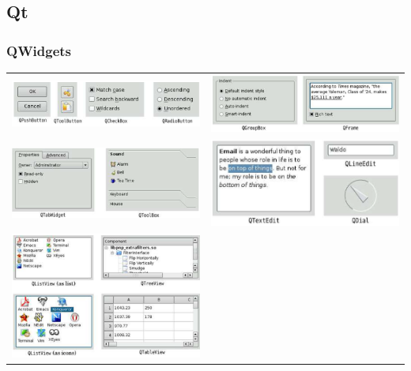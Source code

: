 \subsection{Qt}
\subsubsection{QWidgets}
\begin{tabular}{c c}
	\includegraphics[width=9cm]{images/button_1.png}& \includegraphics[width=9cm]{images/button_2.png}\\
	\includegraphics[width=9cm]{images/button_3.png}& \includegraphics[width=9cm]{images/button_7.png}\\
	\includegraphics[width=9cm]{images/button_4.png}&

\end{tabular}
